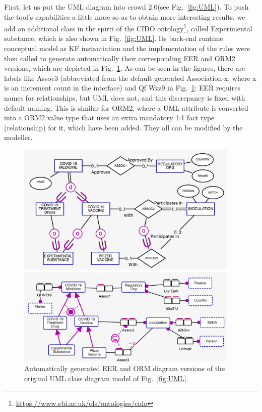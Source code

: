 \documentclass[sn-mathphys]{sn-jnl}
\newcommand{\crowdtwo}{{\sf crowd 2.0}\xspace}
\begin{document}
First, let us put the UML diagram into \crowdtwo (see Fig.~\ref{fig:UML}). To push the tool's capabilities a little more so as to obtain more interesting results, we add an additional class in the spirit of the CIDO ontology\footnote{\url{https://www.ebi.ac.uk/ols/ontologies/cido}}, called {\sf Experimental substance}, which is also shown in Fig.~\ref{fig:UML}. Its back-end runtime conceptual model as KF instantiation and the implementation of the rules were then called to generate automatically their corresponding EER and ORM2 versions, which are depicted in Fig.~\ref{fig:ERandORM}. As can be seen in the figures, there are labels like {\sf Assoc3} (abbreviated from the default generated {\sf Association-x}, where x is an increment count in the interface) and  {\sf Qf Wzz9} in Fig.~\ref{fig:ERandORM}: EER requires names for relationships, but UML does not, and this discrepancy is fixed with default naming. This is similar for ORM2, where  a UML attribute is converted into a ORM2 value type that uses an extra mandatory 1:1 fact type (relationship) for it, which have been added. They all can be modified by the modeller.


\begin{figure}[h]
  \centering
   \includegraphics[width=0.95\textwidth]{covidER1.pdf} 
   
         \vspace{1mm}
         
         \includegraphics[width=0.95\textwidth]{covidORM1.pdf} 
         
    \caption{Automatically generated EER and ORM diagram versions of the original UML class diagram model of Fig.~\ref{fig:UML}.}
    \label{fig:ERandORM}
\end{figure}
\end{document}

